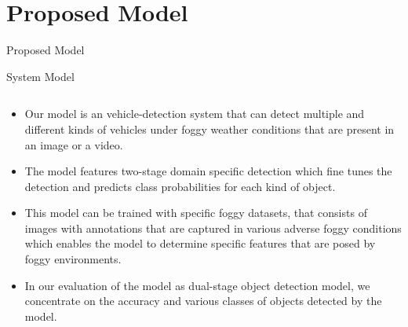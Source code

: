 \documentclass[10pt,aspectratio=169,t]{beamer}
\begin{document}
\section{Proposed Model}
\begin{frame}[allowframebreaks]{Proposed Model}

\vspace{-0.25cm}
\begin{block}{System Model}
\end{block}
\begin{columns}
\begin{column}{1\textwidth}
\vspace{-0.5cm}
\begin{itemize}
 \justifying
 \item Our model is an vehicle-detection system that can detect multiple and different kinds of vehicles under foggy weather conditions that are present in an image or a video.
 \item The model features two-stage domain specific detection which fine tunes the detection and predicts class probabilities for each kind of object.
 \item This model can be trained with specific foggy datasets, that consists of images with annotations that are captured in various adverse foggy conditions which enables the model to determine specific features that are posed by foggy environments.
 \item In our evaluation of the model as dual-stage object detection model, we concentrate on the accuracy and various classes of objects detected by the model.

\end{itemize}
\end{column}
\end{columns}



\end{frame}
\newpage
\end{document}

